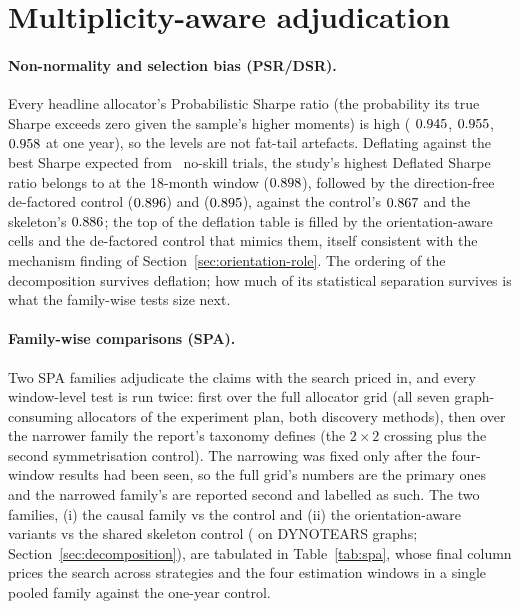 \section{Multiplicity-aware adjudication}
\label{sec:believe-rigour}


\paragraph{Non-normality and selection bias (PSR/DSR).} Every headline
allocator's Probabilistic Sharpe ratio (the probability its true Sharpe
exceeds zero given the sample's higher moments) is high (\HRP{}
$0.945$, \skelsamp{} $0.955$, \skelsem{} $0.958$ at
one year), so the
levels are not fat-tail artefacts. Deflating against the best Sharpe
expected from \rsNtrials\ no-skill trials, the study's highest Deflated
Sharpe ratio belongs to \orientsem{} at the 18-month window
($0.898$), followed by the direction-free de-factored
control ($0.896$) and \skelsem{} ($0.895$), against
the control's $0.867$ and the skeleton's
$0.886$; the top of the deflation table is filled by the
orientation-aware cells and the de-factored control that mimics them,
itself consistent with the mechanism finding of
Section~\ref{sec:orientation-role}. The ordering of the decomposition survives deflation;
how much of its statistical separation survives is what the family-wise
tests size next.

\paragraph{Family-wise comparisons (SPA).} Two SPA families
adjudicate the claims with the search priced in, and every window-level
test is run twice: first over the full allocator grid (all
seven graph-consuming allocators of the experiment plan, both discovery
methods), then over the
narrower family the report's taxonomy defines (the $2\times2$ crossing
plus the second symmetrisation control). The narrowing was fixed only
after the four-window results had been seen, so the full grid's
numbers are the primary ones and the narrowed family's are reported
second and labelled as such. The two families, (i)
the causal family vs the \HRP{} control and (ii) the
orientation-aware variants vs the shared skeleton control (\skelsamp{}
on DYNOTEARS graphs; Section~\ref{sec:decomposition}), are tabulated in
Table~\ref{tab:spa}, whose final column prices the search across
strategies and the four estimation windows in a single pooled
family against the one-year control.

